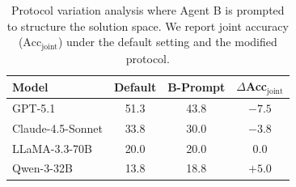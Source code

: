 \begin{table}[t]
\centering
\small
\setlength{\tabcolsep}{5pt}
\begin{tabular}{lccc}
\toprule
\textbf{Model} & \textbf{Default} & \textbf{B-Prompt} & $\Delta$Acc$_{\text{joint}}$ \\
\midrule
GPT-5.1 & 51.3 & 43.8 & $-7.5$ \\
Claude-4.5-Sonnet & 33.8 & 30.0 & $-3.8$ \\
LLaMA-3.3-70B & 20.0 & 20.0 & $0.0$ \\
Qwen-3-32B & 13.8 & 18.8 & $+5.0$ \\
\bottomrule
\end{tabular}
\caption{Protocol variation analysis where Agent B is prompted to structure the solution space. We report joint accuracy ($\mathrm{Acc}_{\text{joint}}$) under the default setting and the modified protocol.}
\label{tab:initiator_dominance}
\end{table}